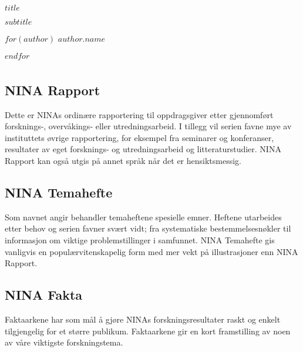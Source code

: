 \documentclass[11pt, a4paper]{article}
\begin{document}

\begin{titlepage}
\thispagestyle{titlefooter}
\Huge{$title$} \par\vspace{.5cm}
\huge{$subtitle$} \par\vspace{1cm}
$for(author)$
\LARGE{$author.name$} \par
$endfor$
\restoregeometry
\end{titlepage}
\cfoot{}

\section*{}


\subsection*{\small{NINA Rapport}}
{\small Dette er NINAs ordinære rapportering til oppdragsgiver etter gjennomført forsknings\hyp{}, overvåkings\hyp{} eller utredningsarbeid. I tillegg vil serien favne mye av instituttets øvrige rapportering, for eksempel
fra seminarer og konferanser, resultater av eget forsknings\hyp{} og utredningsarbeid og litteraturstudier.
NINA Rapport kan også utgis på annet språk når det er hensiktsmessig.}

\subsection*{\small{NINA Temahefte}}
{\small Som navnet angir behandler temaheftene spesielle emner. Heftene utarbeides etter behov og
serien favner svært vidt; fra systematiske bestemmelsesnøkler til informasjon om viktige
problemstillinger i samfunnet. NINA Temahefte gis vanligvis en populærvitenskapelig form med mer
vekt på illustrasjoner enn NINA Rapport.}

\subsection*{\small{NINA Fakta}}
{\small Faktaarkene har som mål å gjøre NINAs forskningsresultater raskt og enkelt tilgjengelig for et større
publikum. Faktaarkene gir en kort framstilling av noen av våre viktigste forskningstema.}
\end{document}

